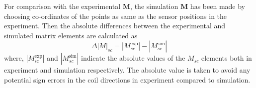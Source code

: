 
For comparison with the experimental $\bm{M}$, the simulation $\bm{M}$
has been made by choosing co-ordinates of the points as same as the
sensor positions in the experiment. Then the absolute differences
between the experimental and simulated matrix elements are calculated
as
\begin{equation}
    \Delta|M|_{sc}=|M_{sc}^{\text{exp}}|-|M_{sc}^{\text{sim}}|
\end{equation}
where, $|M_{\text{sc}}^{\text{exp}}|$ and $|M_{sc}^{\text{sim}}|$
indicate the absolute values of the $M_{sc}$ elements both in
experiment and simulation respectively.  The absolute value is taken
to avoid any potential sign errors in the coil directions in
experiment compared to simulation.





